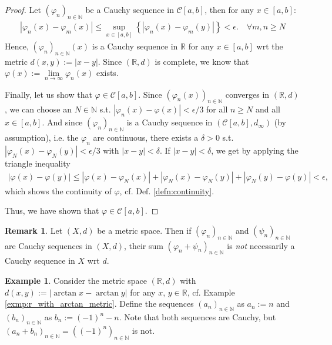 \documentclass[12pt, a4paper]{article}
\numberwithin{equation}{section}
\theoremstyle{definition}
\theoremstyle{definition}
\newtheorem{exmp}[thm]{Example} %
\newtheorem{remark}[thm]{Remark} %
\newcommand{\abs}[1]{\left\vert #1 \right\vert}
\newcommand{\seq}[1][\varphi]{\left( #1 \right)_{n \in \mathbb{N}}}
\begin{document}
	\begin{proof}
		Let $(\varphi_n)_{n\in\mathbb N}$ be a Cauchy sequence in $\mathcal C[a, b]$, then for any $x\in [a, b]$:
		\begin{align}
			\abs{\varphi_n(x) - \varphi_m(x)} \leq \sup_{x\in [a, b]}\left\{ \abs{\varphi_{n}(x) - \varphi_{m}(y)} \right\} < \epsilon. \quad\forall m, n\geq N
		\end{align} 
		Hence, $(\varphi_n)_{n\in\mathbb N}(x)$ is a Cauchy sequence in $\mathbb R$ for any $x\in[a, b]$ wrt the metric $d(x, y) := \abs{x - y}$. Since $\left(\mathbb R, d\right)$ is complete, we know that $\varphi(x) := \lim\limits_{n\to\infty}\varphi_n(x)$ exists. 
		
		Finally, let us show that $\varphi\in\mathcal C[a, b]$. Since $\left(\varphi_n(x)\right)_{n\in\mathbb N}$ converges in $(\mathbb R, d)$, we can choose an $N\in\mathbb N$ s.t. $\abs{\varphi_n(x) - \varphi(x)} < \epsilon/3$ for all $n\geq N$ and all $x\in[a, b]$. And since $\left(\varphi_n\right)_{n\in\mathbb N}$ is a Cauchy sequence in $(\mathcal C[a, b], d_{\infty})$ (by assumption), i.e. the $\varphi_n$ are continuous, there exists a $\delta > 0$ s.t. $\abs{\varphi_N(x) - \varphi_{N}(y)} < \epsilon/3$ with $\abs{x - y} < \delta$. If $\abs{x-y} < \delta$, we get by applying the triangle inequality
		\begin{align}
			\abs{\varphi(x) - \varphi(y)} \leq \abs{\varphi(x) - \varphi_N(x)} + \abs{\varphi_N(x) - \varphi_N(y)} + \abs{\varphi_N(y) - \varphi(y)} < \epsilon,
		\end{align}
		which shows the continuity of $\varphi$, cf. Def. \ref{defn:continuity}.
		
		Thus, we have shown that $\varphi\in\mathcal C[a, b]$.
	\end{proof}
	
	\begin{remark}
		Let $(X, d)$ be a metric space. Then if $\seq[\varphi_n]$ and $\seq[\psi_n]$ are Cauchy sequences in $(X, d)$, their sum $\seq[\varphi_n + \psi_n]$ is \textit{not} necessarily a Cauchy sequence in $X$ wrt $d$.
	\end{remark}

	\begin{exmp}\label{exmp:counter_exmp_sum_Cauchy_not_Cauchy}
		Consider the metric space $(\mathbb R, d)$ with $d(x, y) := \abs{\arctan x - \arctan y}$ for any $x$, $y\in\mathbb R$, cf. Example \ref{exmp:r_with_arctan_metric}. Define the sequences $\seq[a_n]$ as $a_n := n$ and $\seq[b_n]$ as $b_n := (-1)^n - n$. Note that both sequences are Cauchy, but $\seq[a_n + b_n] = \seq[(-1)^n]$ is not.
	\end{exmp}
\end{document}
